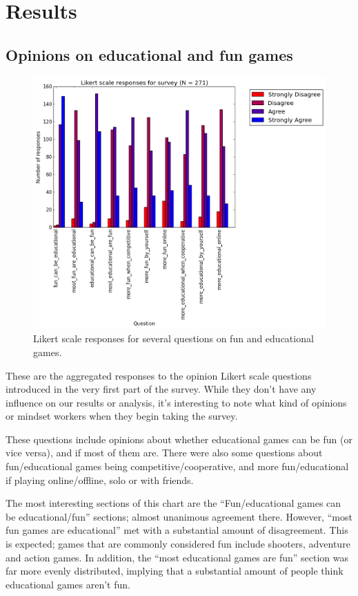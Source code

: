 \chapter{Results}

	\section{Opinions on educational and fun games}
		\begin{figure}[] 
		\centering 
		\includegraphics[width=\textwidth]{survey_likert.png} 
		\caption{Likert scale responses for several questions on fun and educational games.}
		\end{figure}
	These are the aggregated responses to the opinion Likert scale questions introduced in the very first part of the survey. While they don't have any influence on our results or analysis, it's interesting to note what kind of opinions or mindset workers when they begin taking the survey.

	These questions include opinions about whether educational games can be fun (or vice versa), and if most of them are. There were also some questions about fun/educational games being competitive/cooperative, and more fun/educational if playing online/offline, solo or with friends.

	The most interesting sections of this chart are the ``Fun/educational games can be educational/fun'' sections; almost unanimous agreement there. However, ``most fun games are educational'' met with a substantial amount of disagreement. This is expected; games that are commonly considered fun include shooters, adventure and action games. In addition, the ``most educational games are fun'' section was far more evenly distributed, implying that a substantial amount of people think educational games aren't fun.


